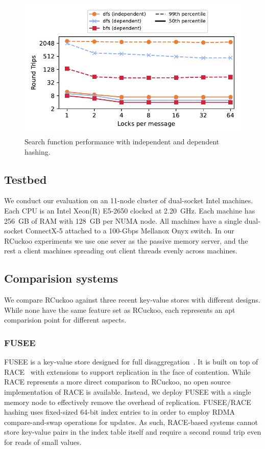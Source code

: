 \begin{figure}[ht]
    \includegraphics[width=0.99\linewidth]{fig/search_dependence.pdf}

    \caption{ Search function performance with independent
    and dependent hashing.}

    \label{fig:search_dependence}
\end{figure}

\subsection{Testbed}

We conduct our evaluation on an 11-node cluster of dual-socket
Intel machines. Each CPU is an Intel Xeon(R) E5-2650 clocked
at 2.20~GHz. Each machine has 256~GB of RAM with 128~GB per
NUMA node. All machines have a single dual-socket ConnectX-5
attached to a 100-Gbps Mellanox Onyx switch. In our
RCuckoo experiments we use one sever as the passive memory server,
and the rest a client machines spreading out client threads
evenly across machines.

\subsection{Comparision systems}

We compare RCuckoo against three recent key-value stores with
different designs.  While none have the same feature set as RCuckoo,
each represents an apt comparision point for different aspects.

\subsubsection{FUSEE}

FUSEE is a key-value store designed for full
disaggregation~\cite{fusee}.  It is built on top of RACE~\cite{race}
with extensions to support replication in the face of contention.
While RACE represents a more direct comparison to RCuckoo, no open
source implementation of RACE is available.  Instead, we deploy FUSEE
with a single memory node to effectively remove the overhead of
replication.  FUSEE/RACE hashing uses fixed-sized 64-bit index entries
to in order to employ RDMA compare-and-swap operations for updates. As
such, RACE-based systems cannot store key-value pairs in the index
table itself and require a second round trip even for reads of small values.

